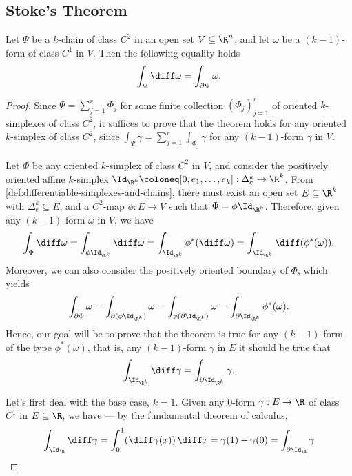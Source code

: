 \subsection{Stoke's Theorem}

\begin{theorem}[Stoke's]
\label{thm:stokes}
Let \(\Psi\) be a \(k\)-chain of class \(C^2\) in an open set \(V \subseteq
\R^n\), and let \(\omega\) be a \((k-1)\)-form of class \(C^1\) in \(V\). Then
the following equality holds
\[
  \int_{\Psi} \diff \omega = \int_{\partial \Psi} \omega.
\]
\end{theorem}

\begin{proof}
Since \(\Psi = \sum_{j=1}^r \Phi_j\) for some finite collection
\((\Phi_j)_{j=1}^r\) of oriented \(k\)-simplexes of class \(C^2\), it suffices
to prove that the theorem holds for any oriented \(k\)-simplex of class \(C^2\),
since \(\int_{\Psi} \gamma = \sum_{j=1}^r \int_{\Phi_j} \gamma\) for any
\((k-1)\)-form \(\gamma\) in \(V\).

Let \(\Phi\) be any oriented \(k\)-simplex of class \(C^2\) in \(V\), and
consider the positively oriented affine \(k\)-simplex \(\Id_{\R^k} \coloneq [0,
e_1, \dots, e_k]: \Delta_{\text{c}}^k \to \R^k\). From
\cref{def:differentiable-simplexes-and-chains}, there must exist an open set \(E
\subseteq \R^k\) with \(\Delta_{\text{c}}^k \subseteq E\), and a \(C^2\)-map
\(\phi: E \to V\) such that \(\Phi = \phi \Id_{\R^k}\). Therefore, given any
\((k-1)\)-form \(\omega\) in \(V\), we have
\[
  \int_{\Phi} \diff \omega
  = \int_{\phi \Id_{\R^k}} \diff \omega
  = \int_{\Id_{\R^k}} \phi^{*}(\diff \omega)
  = \int_{\Id_{\R^k}} \diff (\phi^{*} (\omega)).
\]
Moreover, we can also consider the positively oriented boundary of \(\Phi\),
which yields
\[
  \int_{\partial \Phi} \omega
  = \int_{\partial(\phi \Id_{\R^k})} \omega
  = \int_{\phi(\partial \Id_{\R^k})} \omega
  = \int_{\partial \Id_{\R^k}} \phi^{*}(\omega).
\]
Hence, our goal will be to prove that the theorem is true for any \((k-1)\)-form
of the type \(\phi^{*}(\omega)\), that is, any \((k-1)\)-form \(\gamma\) in
\(E\) it should be true that
\begin{equation}
\label{eq:goal-stokes}
  \int_{\Id_{\R^k}} \diff \gamma = \int_{\partial \Id_{\R^k}} \gamma.
\end{equation}

Let's first deal with the base case, \(k = 1\). Given any \(0\)-form \(\gamma: E
\to \R\) of class \(C^1\) in \(E \subseteq \R\), we have --- by the fundamental
theorem of calculus,
\[
  \int_{\Id_{\R}} \diff \gamma
  = \int_0^1 (\diff \gamma(x))\, \diff x
  = \gamma(1) - \gamma(0)
  = \int_{\partial \Id_{\R}} \gamma
\]


\end{proof}

